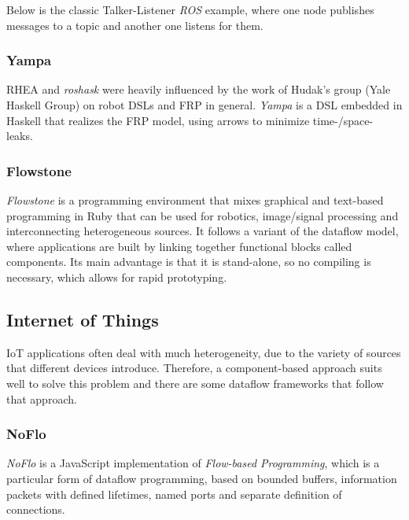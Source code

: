 \documentclass[sigplan,review,anonymous]{acmart}
\begin{document}
Below is the classic Talker-Listener \textit{ROS} example, where one node
publishes messages to a topic and another one listens for them.


\subsubsection{Yampa}

\textsc{RHEA} and \textit{roshask} were heavily influenced by the work of Hudak's
group (Yale Haskell Group) on robot DSLs and FRP in general\cite{fran,arrows_robots,lambda_in_motion,event_frp,real_frp,pushpull_frp}.
\textit{Yampa} is a DSL embedded in Haskell
that realizes the FRP model, using arrows to minimize time-/space- leaks.

\subsubsection{Flowstone}

\textit{Flowstone}  is a
programming environment that mixes graphical and text-based programming in Ruby
that can be used for robotics, image/signal processing and interconnecting
heterogeneous sources. It follows a variant of the dataflow model, where
applications are built by linking together functional blocks called components.
Its main advantage is that it is stand-alone, so no compiling is necessary,
which allows for rapid prototyping.

\subsection{Internet of Things}

IoT applications often deal with much heterogeneity, due to the variety of
sources that different devices introduce. Therefore, a component-based approach
suits well to solve this problem and there are some dataflow frameworks that
follow that approach.

\subsubsection{NoFlo}

\textit{NoFlo} is a JavaScript implementation of
\textit{Flow-based Programming}\cite{fbp}, which is a particular form of dataflow
programming, based on bounded buffers, information packets with defined
lifetimes, named ports and separate definition of connections.
\end{document}
